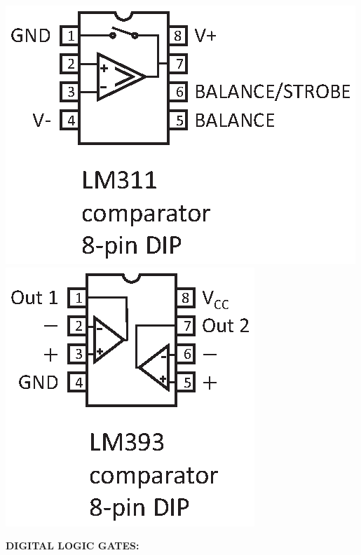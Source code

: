 \hspace{0.25in}
\includegraphics[scale=0.8]{appendices/pinouts/LM311.eps}
\includegraphics[scale=0.8]{appendices/pinouts/LM393.eps}


\medskip
\textbf{DIGITAL LOGIC GATES:}

